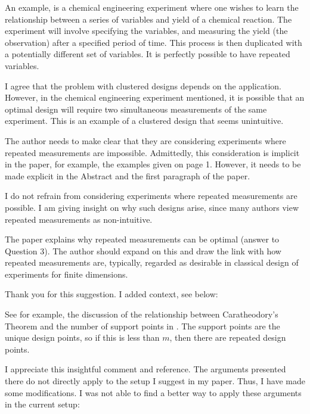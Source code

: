 \RC An example, is a chemical engineering experiment where one wishes
to learn the relationship between a series of variables and yield of a
chemical reaction. The experiment will involve specifying the
variables, and measuring the yield (the observation) after a specified
period of time. This process is then duplicated with a potentially
different set of variables.  It is perfectly possible to have repeated
variables.

\AR I agree that the problem with clustered designs depends on the
application. However, in the chemical engineering experiment
mentioned, it is possible that an optimal design will require two
simultaneous measurements of the same experiment. This is an example
of a clustered design that seems unintuitive.

 
\RC The author needs to make clear that they are considering
experiments where repeated measurements are impossible. Admittedly,
this consideration is implicit in the paper, for example, the examples
given on page 1. However, it needs to be made explicit in the Abstract
and the first paragraph of the paper.

\AR I do not refrain from considering experiments where repeated
measurements are possible. I am giving insight on why such designs
arise, since many authors view repeated measurements as non-intuitive.

  
\RC The paper explains why repeated measurements can be optimal
(answer to Question 3). The author should expand on this and draw the
link with how repeated measurements are, typically, regarded as
desirable in classical design of experiments for finite
dimensions.

\AR Thank you for this suggestion. I added context, see below:

\begin{quote}


\end{quote}

\RC See for example, the discussion of the relationship between
Caratheodory’s Theorem and the number of support points in \cite[page
  139]{pronzatoPazman2013}. The support points are the unique design
points, so if this is less than $m$, then there are repeated design
points.
  
\AR I appreciate this insightful comment and reference. The arguments
presented there do not directly apply to the setup I suggest in my
paper. Thus, I have made some modifications. I was not able to find a
better way to apply these arguments in the current setup:

